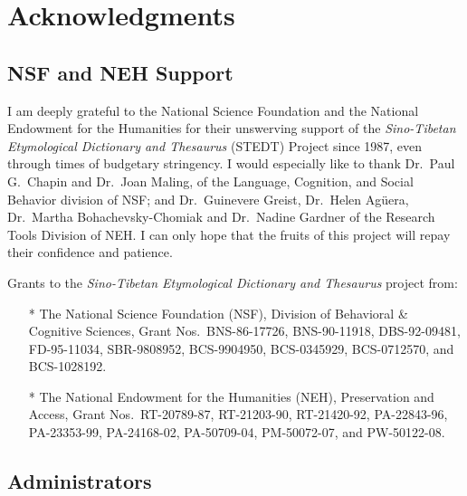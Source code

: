\vspace{0.25em}

\chapter*{Acknowledgments}

\renewcommand{\thefootnote}{\arabic{footnote}}
\setcounter{footnote}{0}

\section{NSF and NEH Support}

I am deeply grateful to the National Science Foundation and the National Endowment for the Humanities for their unswerving support of the {\it Sino-Tibetan Etymological Dictionary and Thesaurus} (STEDT) Project since 1987, even through times of budgetary stringency. I would especially like to thank Dr.\ Paul G.\ Chapin and Dr.\ Joan Maling, of the Language, Cognition, and Social Behavior division of NSF; and Dr.\ Guinevere Greist, Dr.\ Helen Ag\"uera, Dr.\ Martha Bohachevsky-Chomiak and Dr.\ Nadine Gardner of the Research Tools Division of NEH. I can only hope that the fruits of this project will repay their confidence and patience.

Grants to the \textit{Sino-Tibetan Etymological Dictionary and Thesaurus} project from:

\begin{itemize}
\item[*] The National Science Foundation (NSF), Division of
  Behavioral \& Cognitive Sciences, Grant Nos.\ BNS-86-17726,
  BNS-90-11918, DBS-92-09481, FD-95-11034, SBR-9808952,
  BCS-9904950, BCS-0345929,  BCS-0712570, and BCS-1028192.
\item[*] The National Endowment for the Humanities (NEH),
  Preservation and Access, Grant Nos.\ RT-20789-87, RT-21203-90,
  RT-21420-92, PA-22843-96, PA-23353-99, PA-24168-02,
  PA-50709-04,  PM-50072-07, and PW-50122-08.
\end{itemize}

\section{Administrators}

